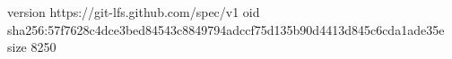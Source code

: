 version https://git-lfs.github.com/spec/v1
oid sha256:57f7628c4dce3bed84543c8849794adccf75d135b90d4413d845c6cda1ade35e
size 8250
